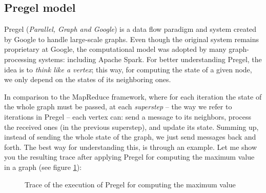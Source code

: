 \subsection{Pregel model}

Pregel (\textit{Parallel, Graph and Google}) is a data flow paradigm and system created by Google to handle large-scale graphs. Even though the original system remains proprietary at Google, the computational model was adopted by many graph-processing systems: including Apache Spark. For better understanding Pregel, the idea is to \textit{think like a vertex}; this way, for computing the state of a given node, we only depend on the states of its neighboring ones.

In comparison to the MapReduce framework, where for each iteration the state of the whole graph must be passed, at each \textit{superstep} -- the way we refer to iterations in Pregel -- each vertex can: send a message to its neighbors, process the received ones (in the previous superstep), and update its state. Summing up, instead of sending the whole state of the graph, we just send messages back and forth. The best way for understanding this, is through an example. Let me show you the resulting trace after applying Pregel for computing the maximum value in a graph (see figure \ref{fig:pregel}):

\begin{figure}[h]
    \centering
    
    \caption[Trace of the execution of Pregel for computing the maximum value]{Trace of the execution of Pregel for computing the maximum value~\cite{10.1145/1807167.1807184}}
    \label{fig:pregel}
\end{figure}